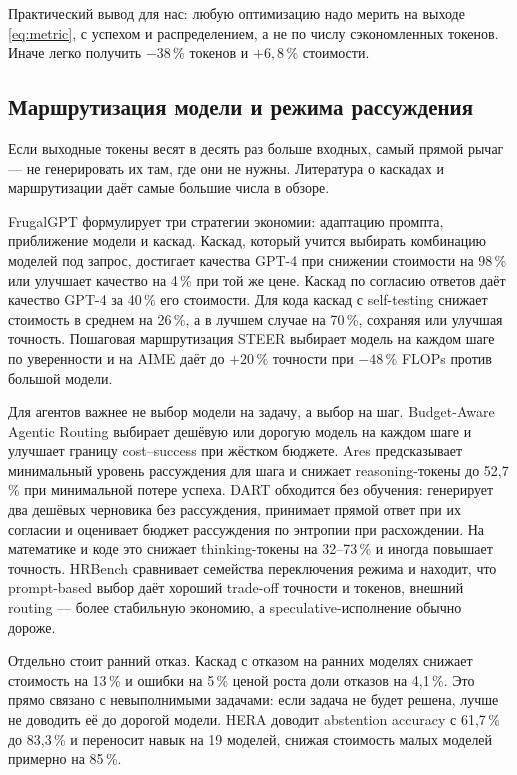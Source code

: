 \documentclass[11pt,a4paper]{article}
\begin{document}
Практический вывод для нас: любую оптимизацию надо мерить на выходе
\eqref{eq:metric}, с успехом и распределением, а не по числу сэкономленных
токенов. Иначе легко получить $-38\,\%$ токенов и $+6{,}8\,\%$ стоимости.

\subsection{Маршрутизация модели и режима рассуждения}

Если выходные токены весят в десять раз больше входных, самый прямой рычаг —
не генерировать их там, где они не нужны. Литература о каскадах и
маршрутизации даёт самые большие числа в обзоре.

FrugalGPT \cite{chen2023frugalgptuse} формулирует три стратегии экономии:
адаптацию промпта, приближение модели и каскад. Каскад, который учится
выбирать комбинацию моделей под запрос, достигает качества GPT-4 при
снижении стоимости на 98\,\% или улучшает качество на 4\,\% при той же
цене. Каскад по согласию ответов \cite{yue2023largelanguage} даёт качество
GPT-4 за 40\,\% его стоимости. Для кода каскад с self-testing
\cite{chen2024modelcascading} снижает стоимость в среднем на 26\,\%, а в
лучшем случае на 70\,\%, сохраняя или улучшая точность. Пошаговая
маршрутизация STEER \cite{lee2025confidenceguided} выбирает модель на
каждом шаге по уверенности и на AIME даёт до $+20\,\%$ точности при
$-48\,\%$ FLOPs против большой модели.

Для агентов важнее не выбор модели на задачу, а выбор на шаг.
Budget-Aware Agentic Routing \cite{zhang2026budgetaware} выбирает дешёвую
или дорогую модель на каждом шаге и улучшает границу cost--success при
жёстком бюджете. Ares \cite{yang2026aresadaptive} предсказывает минимальный
уровень рассуждения для шага и снижает reasoning-токены до 52{,}7\,\% при
минимальной потере успеха. DART \cite{lee2026dartdraft} обходится без
обучения: генерирует два дешёвых черновика без рассуждения, принимает
прямой ответ при их согласии и оценивает бюджет рассуждения по энтропии при
расхождении. На математике и коде это снижает thinking-токены на
32--73\,\% и иногда повышает точность. HRBench \cite{ning2026hrbenchbenchmarkin}
сравнивает семейства переключения режима и находит, что prompt-based выбор
даёт хороший trade-off точности и токенов, внешний routing — более
стабильную экономию, а speculative-исполнение обычно дороже.

Отдельно стоит ранний отказ. Каскад с отказом на ранних моделях
\cite{zellinger2025costsaving} снижает стоимость на 13\,\% и ошибки на
5\,\% ценой роста доли отказов на 4{,}1\,\%. Это прямо связано с
невыполнимыми задачами: если задача не будет решена, лучше не доводить её
до дорогой модели. HERA \cite{luo2026heraharness} доводит abstention
accuracy с 61{,}7\,\% до 83{,}3\,\% и переносит навык на 19 моделей,
снижая стоимость малых моделей примерно на 85\,\%.
\end{document}
